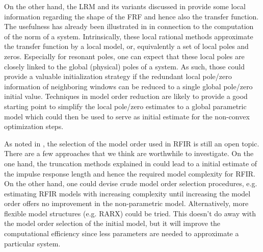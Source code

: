   On the other hand, the \gls{LRM} and its variants discussed in  provide some local information regarding the shape of the \gls{FRF} and hence also the transfer function.
  The usefulness has already been illustrated in  in connection to the computation of the \Hinf norm of a system.
  Intrinsically, these local rational methods approximate the transfer function by a local model, or, equivalently a set of local poles and zeros.
  Especially for resonant poles, one can expect that these local poles are closely linked to the global (physical) poles of a system.
  As such, those could provide a valuable initialization strategy if the redundant local pole/zero information of neighboring windows can be reduced to a single global pole/zero initial value.
  Techniques in model order reduction are likely to provide a good starting point to simplify the local pole/zero estimates to a global parametric model which could then be used to serve as initial estimate for the non-convex optimization steps.

As noted in , the selection of the model order used in \gls{RFIR} is still an open topic.
There are a few approaches that we think are worthwhile to investigate.
On the one hand, the truncation methods explained in  could lead to a initial estimate of the impulse response length and hence the required model complexity for \gls{RFIR}.
On the other hand, one could devise crude model order selection procedures, e.g.  estimating \gls{RFIR} models with increasing complexity until increasing the model order offers no improvement in the non-parametric model.
Alternatively, more flexible model structures (e.g. \gls{RARX}) could be tried.
This doesn't do away with the model order selection of the initial model, but it will improve the computational efficiency since less parameters are needed to approximate a particular system.

  
